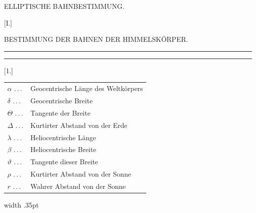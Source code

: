 \newcommand{\AstNode}{\mathord{\vcenter{\hbox{\begin{tikzpicture}[x=1ex,y=1ex,line width=.06ex]
\draw (-.27,.03) circle (.135);
\draw (.27,.03) circle (.135);
\draw (-.19,.14) .. controls (-.55,.78) and (.55,.78) .. (.19,.14);
\end{tikzpicture}}}}}
\clearpage\begingroup\NoSourceHead{}
\begin{center}
{\Large ELLIPTISCHE BAHNBESTIMMUNG.}\par\vspace{1.2em}
{\large{}}\par\vspace{1.2em}
[I.]
\end{center}
\noindent{\small [S. 1]}
\begin{center}
BESTIMMUNG DER BAHNEN DER HIMMELSKÖRPER.
\end{center}
\noindent\rule{\linewidth}{.35pt}\par
{}
\par\noindent\rule{\linewidth}{.35pt}
\begin{center}
[1.]\par\medskip
{}
\end{center}
\noindent\begin{minipage}[t]{.48\linewidth}
\small\setlength{\tabcolsep}{0pt}\renewcommand{\arraystretch}{1.2}
\begin{tabular}{@{}l@{\quad}p{.77\linewidth}@{}}
$\alpha$ .\,.\,. & Geocentrische Länge des Weltkörpers\\
$\delta$ .\,.\,. & Geocentrische Breite\\
$\Theta$ .\,.\,. & Tangente der Breite\\
$\Delta$ .\,.\,. & Kurtirter Abstand von der Erde\\
$\lambda$ .\,.\,. & Heliocentrische Länge\\
$\beta$ .\,.\,. & Heliocentrische Breite\\
$\vartheta$ .\,.\,. & Tangente dieser Breite\\
$\rho$ .\,.\,. & Kurtirter Abstand von der Sonne\\
$r$ .\,.\,. & Wahrer Abstand von der Sonne
\end{tabular}
\end{minipage}\hfill\vrule width .35pt\hfill
